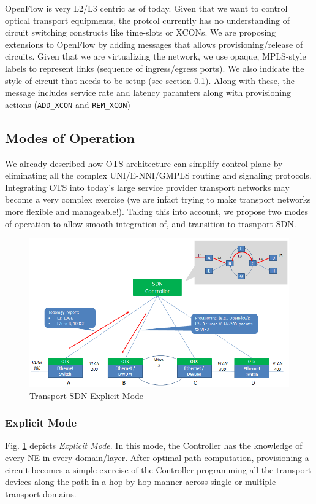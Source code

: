 \documentclass{sig-alternate-10pt}
\begin{document}
	OpenFlow \cite{OF1.0} is very L2/L3 centric as of today. Given that we want to control optical transport
	equipments, the protcol currently has no understanding of circuit switching constructs like time-slots or
	XCONs. We are proposing extensions to OpenFlow by adding messages that allows provisioning/release of
	circuits. Given that we are virtualizing the network, we use opaque, MPLS-style labels to represent links
	(sequence of ingress/egress ports). We also indicate the style of circuit that needs to be setup (see
	section \ref{sec:modes}). Along with these, the message includes service rate and latency paramters along
	with provisioning actions (\texttt{ADD\_XCON} and \texttt{REM\_XCON})
	
	\subsection{Modes of Operation} \label{sec:modes}
	We already described how OTS architecture can simplify control plane by eliminating all the complex
	UNI/E-NNI/GMPLS routing and signaling protocols. Integrating OTS into today's large service provider transport
	networks may become a very complex exercise (we are infact trying to make transport networks more
	flexible and manageable!). Taking this into account, we propose two modes of operation to allow smooth
	integration of, and transition to trasnport SDN.

	\begin{figure}[htb]
	\centering
	\includegraphics[scale=0.37]{OTSExplicit.png}
	\caption{Transport SDN Explicit Mode}
	\label{fig:OTSExplicit}
	\end{figure}

	\subsubsection{Explicit Mode}
	Fig. \ref{fig:OTSExplicit} depicts \textit{Explicit Mode}. In this mode, the Controller has the knowledge
	of every NE in every domain/layer. After optimal path computation, provisioning a circuit becomes a
	simple exercise of the Controller programming all the transport devices along the path in a hop-by-hop
	manner across single or multiple transport domains.
	
\end{document}
